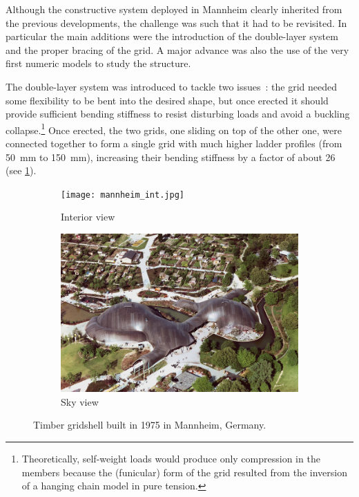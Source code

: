Although the constructive system deployed in Mannheim clearly inherited from the previous developments, the challenge was such that it had to be revisited. In particular the main additions were the introduction of the double-layer system and the proper bracing of the grid. A major advance was also the use of the very first numeric models to study the structure.

The double-layer system was introduced to tackle two issues~: the grid needed some flexibility to be bent into the desired shape, but once erected it should provide sufficient bending stiffness to resist disturbing loads and avoid a buckling collapse.\footnote{Theoretically, self-weight loads would produce only compression in the members because the (funicular) form of the grid resulted from the inversion of a hanging chain model in pure tension.} Once erected, the two grids, one sliding on top of the other one, were connected together to form a single grid with much higher ladder profiles (from \SI{50}{mm} to \SI{150}{mm}), increasing their bending stiffness by a factor of about 26 (see \cref{fig:mannheim_a}).




\begin{figure}[t]
	\begin{subfigure}[b]{\TwoMediaWidth}
		\texttt{[image: mannheim\_int.jpg]}
		\caption{Interior view}
		\label{fig:mannheim_a}
	\end{subfigure}%
	\hspace{\MediaGutterWidth}%
	\begin{subfigure}[b]{\TwoMediaWidth}
		\includegraphics[width=\textwidth]{mannheim_sky.jpg}
		\caption{Sky view}
		\label{fig:mannheim_b}
	\end{subfigure}
	\caption[Timber gridshell built in 1962 in Essen, Germany]{Timber gridshell built in 1975 in Mannheim, Germany.}
	\label{fig:mannheim}
\end{figure}

